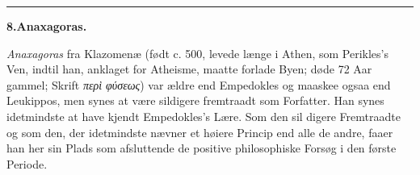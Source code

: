\documentclass[12pt,a4paper]{book}
\newcommand{\divrule}{\begin{center}\rule{2cm}{0.4pt}\end{center}}
\newcommand{\gk}[1]{\textit{#1}}
\begin{document}
\divrule
%
%
%
%
\begin{center}
\textbf{8.\enspace Anaxagoras.}
\end{center}
\emph{Anaxagoras} fra Klazomenæ (født c. 500, levede længe
i Athen, som Perikles's Ven, indtil han, anklaget for Atheisme,
maatte forlade Byen; døde 72 Aar gammel; Skrift \gk{περὶ φύσεως})
var ældre end Empedokles og maaskee ogsaa end Leukippos, men
synes at være sildigere fremtraadt som Forfatter. Han synes
idetmindste at have kjendt Empedokles's Lære. Som den sil\-%
digere Fremtraadte og som den, der idetmindste nævner et
høiere Princip end alle de andre, faaer han her sin Plads som
afsluttende de positive philosophiske Forsøg i den første Periode.
\end{document}
